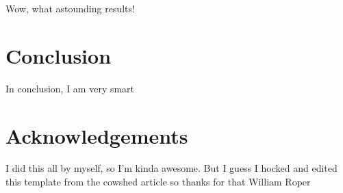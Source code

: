 Wow, what astounding results!

\section{Conclusion}

In conclusion, I am very smart

\section{Acknowledgements}

I did this all by myself, so I'm kinda awesome. But I guess I hocked and edited this template from the cowshed article so thanks for that William Roper

\begingroup
\setlength\bibitemsep{0pt}
\setlength\bibnamesep{0pt}
\printbibliography[heading=subbibliography]
\endgroup

